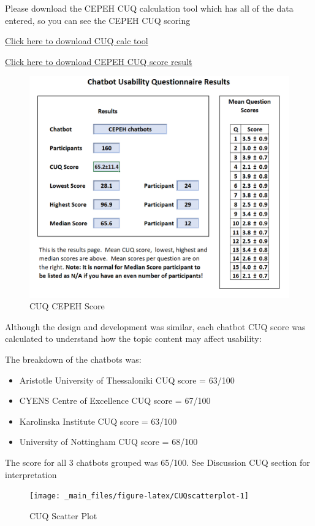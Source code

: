 \documentclass[a4paper, nobind]{templates/ociamthesis}
\providecommand{\tightlist}{%
  \setlength{\itemsep}{0pt}\setlength{\parskip}{0pt}}
\begin{document}
Please download the CEPEH CUQ calculation tool which has all of the data entered, so you can see the CEPEH CUQ scoring

\href{CUQ-Calculation-Tool.xlsx}{Click here to download CUQ calc tool}

\href{cuq.png}{Click here to download CEPEH CUQ score result}

\begin{figure}

{\centering \includegraphics[width=0.75\linewidth]{cuq} 

}

\caption{CUQ CEPEH Score}\label{fig:cuqimage}
\end{figure}

Although the design and development was similar, each chatbot CUQ score was calculated to understand how the topic content may affect usability:

The breakdown of the chatbots was:

\begin{itemize}
\tightlist
\item
  Aristotle University of Thessaloniki CUQ score = 63/100
\item
  CYENS Centre of Excellence CUQ score = 67/100
\item
  Karolinska Institute CUQ score = 63/100
\item
  University of Nottingham CUQ score = 68/100
\end{itemize}

The score for all 3 chatbots grouped was 65/100. See Discussion CUQ
section for interpretation

\begin{figure}

{\centering \texttt{[image: \_main\_files/figure-latex/CUQscatterplot-1]} 

}

\caption{CUQ Scatter Plot}\label{fig:CUQscatterplot}
\end{figure}
\end{document}
